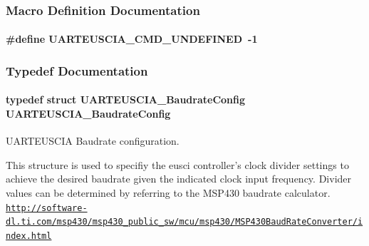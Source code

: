 \subsubsection{Macro Definition Documentation}
\paragraph[{U\-A\-R\-T\-E\-U\-S\-C\-I\-A\-\_\-\-C\-M\-D\-\_\-\-U\-N\-D\-E\-F\-I\-N\-E\-D}]{\setlength{\rightskip}{0pt plus 5cm}\#define U\-A\-R\-T\-E\-U\-S\-C\-I\-A\-\_\-\-C\-M\-D\-\_\-\-U\-N\-D\-E\-F\-I\-N\-E\-D~-\/1}\label{_u_a_r_t_e_u_s_c_i_a_8h_aafc145e68f11619b59d9790a5acc9831}


\subsubsection{Typedef Documentation}
\paragraph[{U\-A\-R\-T\-E\-U\-S\-C\-I\-A\-\_\-\-Baudrate\-Config}]{\setlength{\rightskip}{0pt plus 5cm}typedef struct {\bf U\-A\-R\-T\-E\-U\-S\-C\-I\-A\-\_\-\-Baudrate\-Config}  {\bf U\-A\-R\-T\-E\-U\-S\-C\-I\-A\-\_\-\-Baudrate\-Config}}\label{_u_a_r_t_e_u_s_c_i_a_8h_a2ab5c8b4f9b1bd5b375db37c1fc697e7}


U\-A\-R\-T\-E\-U\-S\-C\-I\-A Baudrate configuration. 

This structure is used to specifiy the eusci controller's clock divider settings to achieve the desired baudrate given the indicated clock input frequency. Divider values can be determined by referring to the M\-S\-P430 baudrate calculator. \href{http://software-dl.ti.com/msp430/msp430_public_sw/mcu/msp430/MSP430BaudRateConverter/index.html}{\tt http\-://software-\/dl.\-ti.\-com/msp430/msp430\-\_\-public\-\_\-sw/mcu/msp430/\-M\-S\-P430\-Baud\-Rate\-Converter/index.\-html}

